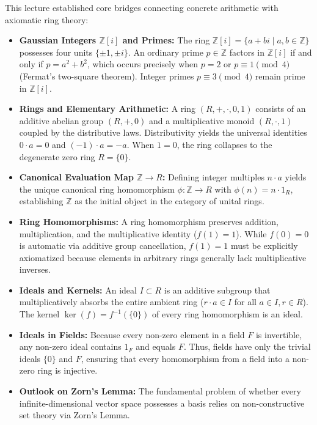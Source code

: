 \begin{overview}
This lecture established core bridges connecting concrete arithmetic with axiomatic ring theory:
\begin{itemize}
    \item \textbf{Gaussian Integers $\mathbb{Z}[i]$ and Primes:} The ring $\mathbb{Z}[i] = \{a + bi \mid a, b \in \mathbb{Z}\}$ possesses four units $\{\pm 1, \pm i\}$. An ordinary prime $p \in \mathbb{Z}$ factors in $\mathbb{Z}[i]$ if and only if $p = a^2 + b^2$, which occurs precisely when $p = 2$ or $p \equiv 1 \pmod 4$ (Fermat's two-square theorem). Integer primes $p \equiv 3 \pmod 4$ remain prime in $\mathbb{Z}[i]$.
    \item \textbf{Rings and Elementary Arithmetic:} A ring $(R, +, \cdot, 0, 1)$ consists of an additive abelian group $(R, +, 0)$ and a multiplicative monoid $(R, \cdot, 1)$ coupled by the distributive laws. Distributivity yields the universal identities $0 \cdot a = 0$ and $(-1) \cdot a = -a$. When $1 = 0$, the ring collapses to the degenerate zero ring $R = \{0\}$.
    \item \textbf{Canonical Evaluation Map $\mathbb{Z} \to R$:} Defining integer multiples $n \cdot a$ yields the unique canonical ring homomorphism $\phi \colon \mathbb{Z} \to R$ with $\phi(n) = n \cdot 1_R$, establishing $\mathbb{Z}$ as the initial object in the category of unital rings.
    \item \textbf{Ring Homomorphisms:} A ring homomorphism preserves addition, multiplication, and the multiplicative identity ($f(1) = 1$). While $f(0) = 0$ is automatic via additive group cancellation, $f(1) = 1$ must be explicitly axiomatized because elements in arbitrary rings generally lack multiplicative inverses.
    \item \textbf{Ideals and Kernels:} An ideal $I \subset R$ is an additive subgroup that multiplicatively absorbs the entire ambient ring ($r \cdot a \in I$ for all $a \in I, r \in R$). The kernel $\ker(f) = f^{-1}(\{0\})$ of every ring homomorphism is an ideal.
    \item \textbf{Ideals in Fields:} Because every non-zero element in a field $F$ is invertible, any non-zero ideal contains $1_F$ and equals $F$. Thus, fields have only the trivial ideals $\{0\}$ and $F$, ensuring that every homomorphism from a field into a non-zero ring is injective.
    \item \textbf{Outlook on Zorn's Lemma:} The fundamental problem of whether every infinite-dimensional vector space possesses a basis relies on non-constructive set theory via Zorn's Lemma.
\end{itemize}
\end{overview}
